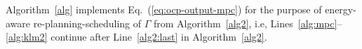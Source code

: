 \documentclass[letterpaper,10pt,journal,twoside]{IEEEtran}
\theoremstyle{definition}
\newtheorem{defn}{Definition}[section]
\begin{document}
Algorithm~\ref{alg} implements Eq.~(\ref{eq:ocp-output-mpc}) for the purpose of energy-aware re-planning-scheduling of $\Gamma$ from Algorithm~\ref{alg2}, i.e, Lines~\ref{alg:mpc}--\ref{alg:klm2} continue after Line~\ref{alg2:last} in Algorithm~\ref{alg2}.







\end{document}
